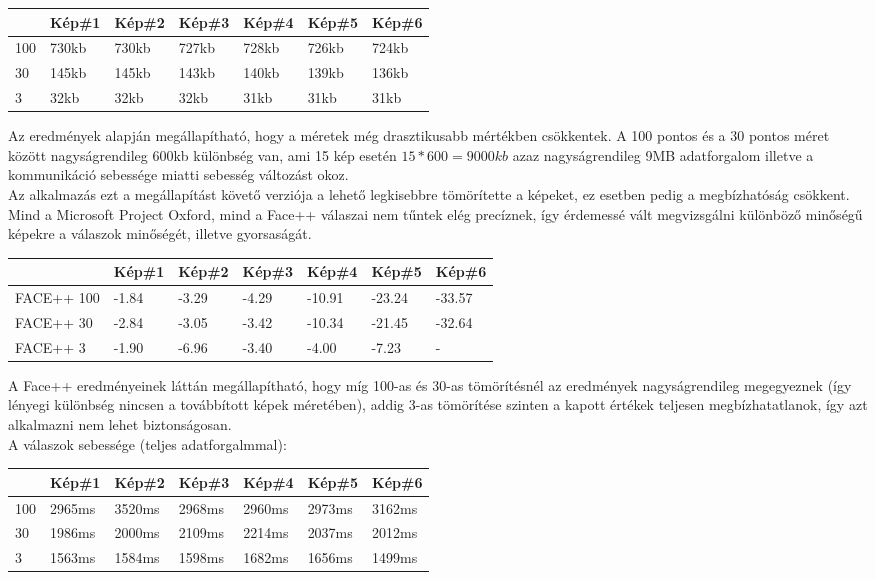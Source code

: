\begin{center}
	\begin{tabular}{|p{1cm}|p{} |p{} | p{}|p{}|p{}|p{}|}
   	\hline
	 & Kép\#1 & Kép\#2& Kép\#3&Kép\#4 &Kép\#5 &Kép\#6\\ \hline
	100 & 730kb & 730kb & 727kb & 728kb & 726kb & 724kb \\ \hline
	30 & 145kb & 145kb & 143kb & 140kb & 139kb & 136kb \\ \hline
	3 & 32kb & 32kb & 32kb & 31kb & 31kb & 31kb\\ \hline
	\end{tabular}
\end{center}

Az eredmények alapján megállapítható, hogy a méretek még drasztikusabb mértékben csökkentek. A 100 pontos és a 30 pontos méret között nagyságrendileg 600kb különbség van, ami 15 kép esetén $15*600 = 9000kb$ azaz nagyságrendileg 9MB adatforgalom illetve a kommunikáció sebessége miatti sebesség változást okoz.
\\Az alkalmazás ezt a megállapítást követő verziója a lehető legkisebbre tömörítette a képeket, ez esetben pedig a megbízhatóság csökkent. Mind a Microsoft Project Oxford, mind a Face++ válaszai nem tűntek elég precíznek, így érdemessé vált megvizsgálni különböző minőségű képekre a válaszok minőségét, illetve gyorsaságát.

\begin{center}
	\begin{tabular}{|p{2cm}|p{} |p{} | p{}|p{}|p{}|p{}|}
   	\hline
	 & Kép\#1 & Kép\#2& Kép\#3&Kép\#4 &Kép\#5 &Kép\#6\\ \hline
	FACE++ 100 & -1.84 & -3.29 & -4.29 & -10.91 & -23.24 & -33.57 \\ \hline
	FACE++ 30 & -2.84 & -3.05 & -3.42 & -10.34 & -21.45 & -32.64 \\ \hline
	FACE++ 3 & -1.90 & -6.96 & -3.40 & -4.00 & -7.23 & -\\ \hline
	\end{tabular}
\end{center}

A Face++ eredményeinek láttán megállapítható, hogy míg 100-as és 30-as tömörítésnél az eredmények nagyságrendileg megegyeznek (így lényegi különbség nincsen a továbbított képek méretében), addig 3-as tömörítése szinten a kapott értékek teljesen megbízhatatlanok, így azt alkalmazni nem lehet biztonságosan. 
\\A válaszok sebessége (teljes adatforgalmmal): 
\begin{center}
	\begin{tabular}{|p{1cm}|p{} |p{} | p{}|p{}|p{}|p{}|}
   	\hline
	 & Kép\#1 & Kép\#2& Kép\#3&Kép\#4 &Kép\#5 &Kép\#6\\ \hline
	100 & 2965ms & 3520ms & 2968ms & 2960ms & 2973ms & 3162ms \\ \hline
	30 & 1986ms & 2000ms & 2109ms & 2214ms & 2037ms & 2012ms \\ \hline
	3 & 1563ms & 1584ms & 1598ms & 1682ms & 1656ms & 1499ms\\ \hline
	\end{tabular}
\end{center}


